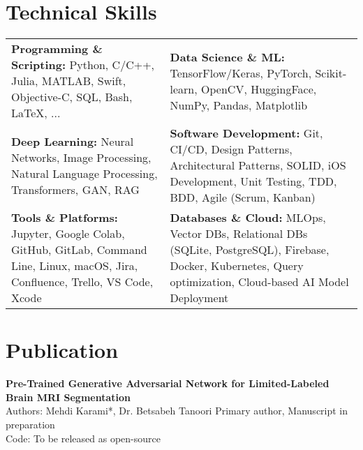 \documentclass[letter,10pt]{article}
\newcommand{\customsquare}{\raisebox{0.25ex}{\scalebox{0.45}{$\blacksquare$}}}
\begin{document}
\section*{Technical Skills}
\begin{tabularx}{\textwidth}{@{}X@{\hspace{5mm}}X@{}}
\customsquare\hspace{2mm}\textbf{Programming \& Scripting:} Python, C/C++, Julia, MATLAB, Swift, Objective-C, SQL, Bash, LaTeX, ... & 
\customsquare\hspace{2mm}\textbf{Data Science \& ML:} TensorFlow/Keras, PyTorch, Scikit-learn, OpenCV, HuggingFace, NumPy, Pandas, Matplotlib \\
\vspace{-1mm}
\customsquare\hspace{2mm}\textbf{Deep Learning:} Neural Networks, Image Processing, Natural Language Processing, Transformers, GAN, RAG &
\vspace{-1mm}
\customsquare\hspace{2mm}\textbf{Software Development:} Git, CI/CD, Design Patterns, Architectural Patterns, SOLID, iOS Development, Unit Testing, TDD, BDD, Agile (Scrum, Kanban) \\
\vspace{-1mm}
\customsquare\hspace{2mm}\textbf{Tools \& Platforms:} Jupyter, Google Colab, GitHub, GitLab, Command Line, Linux, macOS, Jira, Confluence, Trello, VS Code, Xcode &
\vspace{-1mm}
\customsquare\hspace{2mm}\textbf{Databases \& Cloud:} MLOps, Vector DBs, Relational DBs (SQLite, PostgreSQL), Firebase, Docker, Kubernetes, Query optimization, Cloud-based AI Model Deployment
\end{tabularx}

\section*{Publication}
\textbf{Pre-Trained Generative Adversarial Network for Limited-Labeled Brain MRI Segmentation} \\ [5pt]
Authors: Mehdi Karami*, Dr. Betsabeh Tanoori \hfill *Primary author, Manuscript in preparation \\
Code: To be released as open-source

\end{document}
